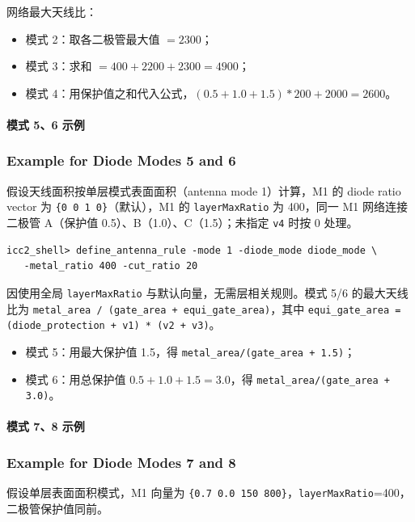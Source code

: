 网络最大天线比：
\begin{itemize}
  \item 模式 2：取各二极管最大值 $=2300$；
  \item 模式 3：求和 $=400+2200+2300=4900$；
  \item 模式 4：用保护值之和代入公式，\((0.5+1.0+1.5)*200+2000=2600\)。
\end{itemize}

\paragraph{模式 5、6 示例}
\subsubsection*{Example for Diode Modes 5 and 6}

假设天线面积按单层模式表面面积（antenna mode 1）计算，M1 的 diode ratio vector 为 \texttt{\{0 0 1 0\}}（默认），M1 的 \texttt{layerMaxRatio} 为 400，同一 M1 网络连接二极管 A（保护值 0.5）、B（1.0）、C（1.5）；未指定 \texttt{v4} 时按 0 处理。

\begin{lstlisting}
icc2_shell> define_antenna_rule -mode 1 -diode_mode diode_mode \
   -metal_ratio 400 -cut_ratio 20
\end{lstlisting}

因使用全局 \texttt{layerMaxRatio} 与默认向量，无需层相关规则。模式 5/6 的最大天线比为
\texttt{metal\_area / (gate\_area + equi\_gate\_area)}，其中
\texttt{equi\_gate\_area = (diode\_protection + v1) * (v2 + v3)}。
\begin{itemize}
  \item 模式 5：用最大保护值 1.5，得 \texttt{metal\_area/(gate\_area + 1.5)}；
  \item 模式 6：用总保护值 \(0.5+1.0+1.5=3.0\)，得 \texttt{metal\_area/(gate\_area + 3.0)}。
\end{itemize}

\paragraph{模式 7、8 示例}
\subsubsection*{Example for Diode Modes 7 and 8}

假设单层表面面积模式，M1 向量为 \texttt{\{0.7 0.0 150 800\}}，\texttt{layerMaxRatio}=400，二极管保护值同前。

